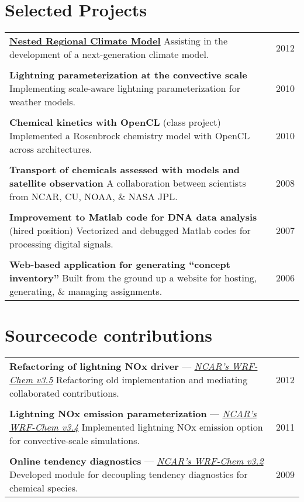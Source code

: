 \documentclass[centered,11pt,line]{res}
\makeatletter
\newcommand{\tabulated}{\begin{tabular}{@{}p{5.5in}p{0.8in}}}
\newcommand{\shrink}{\vspace{-.15in}}
\makeatother
\begin{document}
\begin{resume}
		\section{\sc Selected Projects}
		\tabulated
			\href{http://www.nrcm.ucar.edu}{\bf Nested Regional Climate Model} \newline
			Assisting in the development of a next-generation climate model. & 2012 \\ \\
			{\bf Lightning parameterization at the convective scale} \newline
			Implementing scale-aware lightning parameterization for weather models. & 2010 \\ \\
			{\bf Chemical kinetics with OpenCL} (class project) \newline
			Implemented a Rosenbrock chemistry model with OpenCL across architectures. & 2010 \\ \\
			{\bf Transport of chemicals assessed with models and satellite observation} \newline
			A collaboration between scientists from NCAR, CU, NOAA, \& NASA JPL. & 2008 \\ \\
			{\bf Improvement to Matlab code for DNA data analysis} (hired position) \newline
			Vectorized and debugged Matlab codes for processing digital signals. & 2007 \\ \\
			{\bf Web-based application for generating ``concept inventory''}\newline
			Built from the ground up a website for hosting, generating, \& managing assignments. & 2006
		\end{tabular}\shrink
		
		\section{\sc Sourcecode contributions}
		
		\tabulated
			{\bf Refactoring of lightning NOx driver} --- \href{http://www.mmm.ucar.edu/wrf/users/}{\it NCAR's WRF-Chem v3.5} \newline
			Refactoring old implementation and mediating collaborated contributions. & 2012 \\ \\
			{\bf Lightning NOx emission parameterization} --- \href{http://www.mmm.ucar.edu/wrf/users/}{\it NCAR's WRF-Chem v3.4} \newline
			Implemented lightning NOx emission option for convective-scale simulations. & 2011 \\ \\
			{\bf Online tendency diagnostics} --- \href{http://www.mmm.ucar.edu/wrf/users/}{\it NCAR's WRF-Chem v3.2} \newline
			Developed module for decoupling tendency diagnostics for chemical species. & 2009
		\end{tabular}\shrink

\end{resume}
\end{document}
